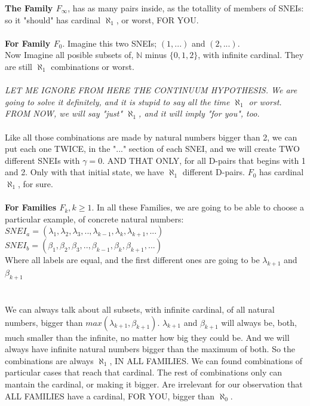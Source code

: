 		\noindent
		\textbf{The Family $F_{\infty}$}, has as many pairs inside, as the totallity of members of SNEIs: so it "should" has cardinal $\aleph_{1}$, or worst, FOR YOU.
		\\\\
		
		\noindent
		\textbf{For Family $F_{0}$}. Imagine this two SNEIs; $(1, ...)$ and $(2, ...)$.\\
		Now Imagine all posible subsets of, $\mathbb{N}$ minus $\{0,1,2\}$, with infinite cardinal. They are still $\aleph_{1}$ combinations or worst.
		\\\\
		
		\noindent
		\textit{LET ME IGNORE FROM HERE THE CONTINUUM HYPOTHESIS. We are going to solve it definitely, and it is stupid to say all the time $\aleph_{1}$ or worst. FROM NOW, we will say "just" $\aleph_{1}$, and it will imply "for you", too.}
		\\\\
		
		\noindent
		Like all those combinations are made by natural numbers bigger than 2, we can put each one TWICE, in the "..." section of each SNEI, and we will create TWO different SNEIs with $\gamma = 0 $. AND THAT ONLY, for all D-pairs that begins with 1 and 2. Only with that initial state, we have $\aleph_{1}$ different D-pairs. $F_{0}$ has cardinal $\aleph_{1}$, for sure.
		\\\\
		
		\noindent
		\textbf{For Families $F_{k}, k\geq1$}. In all these Families, we are going to be able to choose a particular example, of concrete natural numbers:\\
		$SNEI_{a} = (\lambda_{1}, \lambda_{2}, \lambda_{3}, ..  , \lambda_{k-1}, \lambda_{k}, \lambda_{k+1}, ...)$\\
		$SNEI_{b} = (\beta_{1}, \beta_{2}, \beta_{3}, ..  , \beta_{k-1}, \beta_{k}, \beta_{k+1}, ...)$\\
		Where all labels are equal, and the first different ones are going to be $\lambda_{k+1}$ and $\beta_{k+1}$\\
		\\\\
		
		\noindent
		We can always talk about all subsets, with infinite cardinal, of all natural numbers, bigger than $max(\lambda_{k+1},\beta_{k+1})$. $\lambda_{k+1}$ and $\beta_{k+1}$ will always be, both, much smaller than the infinite, no matter how big they could be. And we will always have infinite natural numbers bigger than the maximum of both. So the combinations are always $\aleph_{1}$, IN ALL FAMILIES. We can found combinations of particular cases that reach that cardinal. The rest of combinations only can mantain the cardinal, or making it bigger. Are irrelevant for our observation that ALL FAMILIES have a cardinal, FOR YOU, bigger than $\aleph_{0}$.
		\\\\
	
